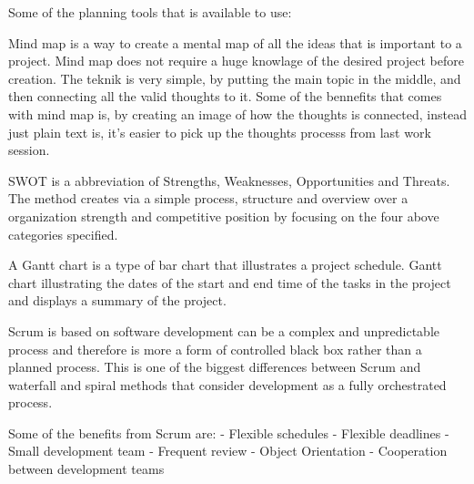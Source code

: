Some of the planning tools that is available to use:

Mind map is a way to create a mental map of all the ideas that is important to a project.
Mind map does not require a huge knowlage of the desired project before creation.
The teknik is very simple, by putting the main topic in the middle, and then connecting all the valid thoughts to it.
Some of the bennefits that comes with mind map is, by creating an image of how the thoughts is connected, instead just plain text is, it's easier to pick up the thoughts processs from last work session.

SWOT is a abbreviation of Strengths, Weaknesses, Opportunities and Threats.
The method creates via a simple process, structure and overview over a organization strength and competitive position by focusing on the four above categories specified.

A Gantt chart is a type of bar chart that illustrates a project schedule.
Gantt chart illustrating the dates of the start and end time of the tasks in the project and displays a summary of the project.

Scrum is based on software development can be a complex and unpredictable process and therefore is more a form of controlled black box rather than a planned process.
This is one of the biggest differences between Scrum and waterfall and spiral methods that consider development as a fully orchestrated process.

Some of the benefits from Scrum are:
 - Flexible schedules
 - Flexible deadlines
 - Small development team
 - Frequent review
 - Object Orientation
 - Cooperation between development teams

